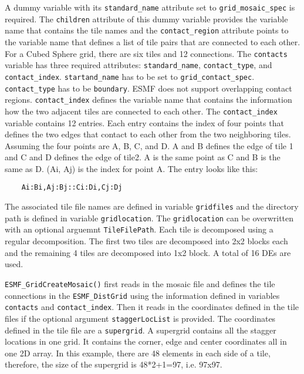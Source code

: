   A dummy variable with its {\tt standard\_name} attribute set to {\tt grid\_mosaic\_spec} is required.
  The {\tt children} attribute of this dummy variable provides the variable name that contains the tile names and the
  {\tt contact\_region} attribute points to the variable name that defines a list of tile pairs that are connected
  to each other.  For a Cubed Sphere grid, there are six tiles and 12 connections.  The {\tt contacts} variable
  has three required attributes: {\tt standard\_name}, {\tt contact\_type}, and {\tt contact\_index}.  {\tt startand\_name}
  has to be set to {\tt grid\_contact\_spec}.  {\tt contact\_type} has to be {\tt boundary}.  ESMF does not support
  overlapping contact regions. {\tt contact\_index} defines the variable name that contains the information how the
  two adjacent tiles are connected to each other.  The {\tt contact\_index} variable contains 12 entries.  Each entry
  contains the index of four points that defines the two edges that contact to
   each other from the two neighboring tiles.  Assuming the four points are A, B, C, and D.
   A and B defines the edge of tile 1 and C and D defines the edge of tile2.  A is the same point
   as C and B is the same as D.  (Ai, Aj) is the index for point A. The entry looks like this:
  \begin{verbatim}
    Ai:Bi,Aj:Bj::Ci:Di,Cj:Dj
  \end{verbatim}
  
  The associated tile file names are defined in variable {\tt gridfiles} and the directory path is defined in
  variable {\tt gridlocation}.
  The {\tt gridlocation} can be overwritten with an optional arguemnt {\tt TileFilePath}.  Each tile is
  decomposed using a regular decomposition.  The first two tiles are decomposed into
  2x2 blocks each and the remaining 4 tiles are decomposed into 1x2 block.
  A total of 16 DEs are used.
  
  {\tt ESMF\_GridCreateMosaic()} first reads in the mosaic file and defines the tile connections in the
  {\tt ESMF\_DistGrid}  using the information
  defined in variables {\tt contacts} and {\tt contact\_index}. Then it reads in the coordinates defined in
  the tile files if the optional argument {\tt staggerLocList} is provided.  The coordinates defined in the tile file are a
  {\tt supergrid}.  A supergrid contains all the stagger locations in one grid.
  It contains the corner, edge and center coordinates all in one 2D array.
  In this example, there are 48 elements in each side of a tile, therefore, the size of the supergrid is
  48*2+1=97, i.e. 97x97.
  
